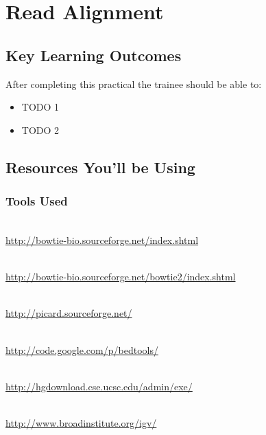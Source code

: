 \renewcommand{\moduleTitle}{Read Alignment}
\renewcommand{\moduleAuthors}{%
  Myrto Kostadima \mailto{kostadim@ebi.ac.uk}
} \renewcommand{\moduleContributions}{%
  Xi Li \mailto{sean.li@csiro.au}%
}

\chapter{\moduleTitle}
\newpage

\section{Key Learning Outcomes}

After completing this practical the trainee should be able to:
\begin{itemize}
  \item TODO 1\\
  \item TODO 2\\
\end{itemize}

\section{Resources You'll be Using}
 
\subsection{Tools Used}
\begin{description}[style=multiline,labelindent=0cm,align=left,leftmargin=0.5cm]
  \item[Bowtie]\hfill\\
  	\url{http://bowtie-bio.sourceforge.net/index.shtml}
  \item[Bowtie 2]\hfill\\
  	\url{http://bowtie-bio.sourceforge.net/bowtie2/index.shtml}
  \item[Samtools]\hfill\\
  	\url{http://picard.sourceforge.net/}
  \item[BEDTools]\hfill\\
  	\url{http://code.google.com/p/bedtools/}
  \item[UCSC tools]\hfill\\
  	\url{http://hgdownload.cse.ucsc.edu/admin/exe/}  
  \item[IGV genome browser]\hfill\\
  	\url{http://www.broadinstitute.org/igv/}
\end{description}

